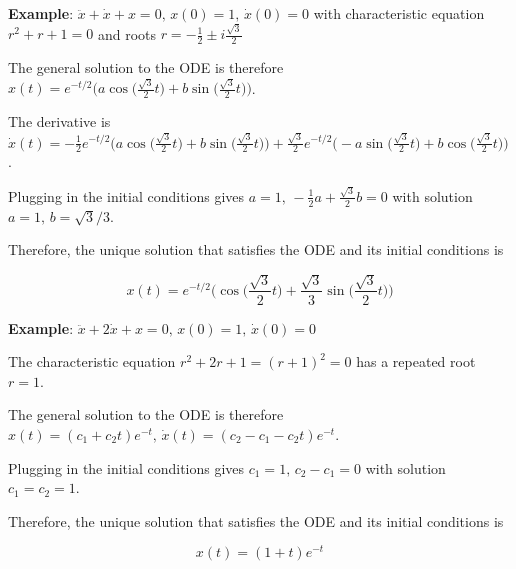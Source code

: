 \textbf{Example}: $\ddot{x} + \dot{x} + x = 0, \, x(0) = 1, \, \dot{x}(0) = 0$ with characteristic equation $r^2 + r + 1 = 0$ and roots $r = - \frac{1}{2} \pm i \frac{\sqrt{3}}{2}$

The general solution to the ODE is therefore $x(t) = e^{-t/2} \Bigg( a \cos\Big(\frac{\sqrt{3}}{2}t\Big) + b \sin\Big(\frac{\sqrt{3}}{2}t\Big) \Bigg)$.

The derivative is $\dot{x}(t) = -\frac{1}{2} e^{-t/2} \Bigg( a \cos\Big(\frac{\sqrt{3}}{2}t\Big) + b \sin\Big(\frac{\sqrt{3}}{2}t\Big) \Bigg) + \frac{\sqrt{3}}{2} e^{-t/2} \Bigg( -a \sin\Big(\frac{\sqrt{3}}{2}t\Big) + b \cos\Big(\frac{\sqrt{3}}{2}t\Big) \Bigg)$.

Plugging in the initial conditions gives $a = 1, \, -\frac{1}{2} a + \frac{\sqrt{3}}{2} b = 0$ with solution $a = 1, \, b = \sqrt{3} / 3$.

Therefore, the unique solution that satisfies the ODE and its initial conditions is

$$x(t) = e^{-t/2} \Bigg( \cos\Big( \frac{\sqrt{3}}{2}t \Big) + \frac{\sqrt{3}}{3} \sin\Big( \frac{\sqrt{3}}{2}t \Big) \Bigg)$$

\vspace{10pt}


\textbf{Example}: $\ddot{x} + 2 \dot{x} + x = 0, \, x(0) = 1, \, \dot{x}(0) = 0$

The characteristic equation $r^2 + 2r + 1 = (r + 1)^2 = 0$ has a repeated root $r = 1$.

The general solution to the ODE is therefore $x(t) = (c_1 + c_2 t) e^{-t}, \, \dot{x}(t) = (c_2 - c_1 - c_2 t) e^{-t}$.

Plugging in the initial conditions gives $c_1 = 1, \, c_2 - c_1 = 0$ with solution $c_1 = c_2 = 1$.

Therefore, the unique solution that satisfies the ODE and its initial conditions is

$$x(t) = (1 + t) e^{-t}$$
